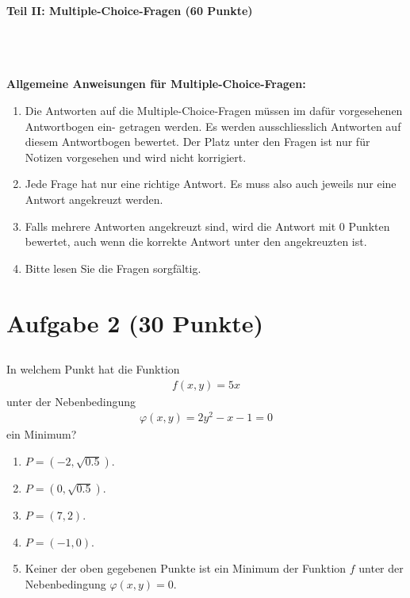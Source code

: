 \begin{Large}
\textbf{Teil II: Multiple-Choice-Fragen (60 Punkte)}
\end{Large}
\\
\\
\\
\textbf{Allgemeine Anweisungen für Multiple-Choice-Fragen:}
\\
\renewcommand{\labelenumi}{(\roman{enumi})}
\begin{enumerate}
\item
Die Antworten auf die Multiple-Choice-Fragen müssen im dafür vorgesehenen Antwortbogen ein-
getragen werden. Es werden ausschliesslich Antworten auf diesem Antwortbogen bewertet. Der
Platz unter den Fragen ist nur für Notizen vorgesehen und wird nicht korrigiert.

\item
Jede Frage hat nur eine richtige Antwort. Es muss also auch jeweils nur eine Antwort angekreuzt
werden.

\item
Falls mehrere Antworten angekreuzt sind, wird die Antwort mit 0 Punkten bewertet, auch wenn
die korrekte Antwort unter den angekreuzten ist.

\item
Bitte lesen Sie die Fragen sorgfältig.

\end{enumerate}
\newpage
\section*{Aufgabe 2 (30 Punkte)}
\vspace{0.4cm}
\subsection*{}
In welchem Punkt hat die Funktion
\begin{align*}
	f(x,y) = 5x
\end{align*}
unter der Nebenbedingung
\begin{align*}
	\varphi(x,y) = 2 y^2 - x - 1 = 0
\end{align*}
ein Minimum?
 \renewcommand{\labelenumi}{(\alph{enumi})}
\begin{enumerate}
\item $ P= (-2,\sqrt{0.5}) $.
\item $ P= (0,\sqrt{0.5}) $.
\item $ P= (7,2) $.
\item $ P= (-1,0) $.
\item Keiner der oben gegebenen Punkte ist ein Minimum der Funktion $ f $ unter der Nebenbedingung $ \varphi(x,y)= 0 $.
\end{enumerate}
\ \\
